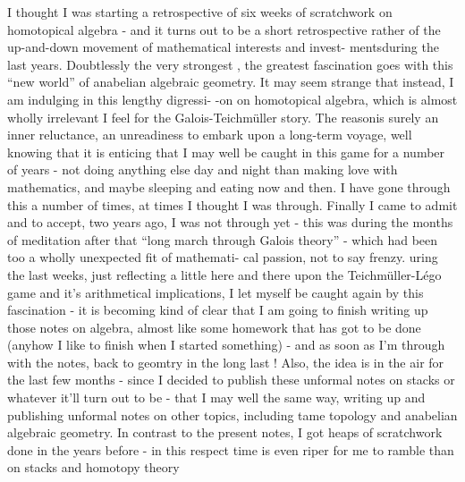 
I thought I was starting a retrospective of six weeks of scratchwork
on homotopical algebra  -  and it turns out to be a  short retrospective
rather of the up-and-down movement of  mathematical interests and invest-%
ments\hand{|}during the last years.  Doubtlessly the very strongest , the greatest
fascination goes with this ``new world'' of anabelian algebraic geometry.
It may seem strange that instead,  I am indulging in this lengthy digressi-%
-on on homotopical algebra,  which is almost wholly irrelevant I feel for
the Galois-Teichmüller story.  The reason\hand{|}is surely an inner reluctance,
an unreadiness to embark upon a long-term voyage,  well knowing that it is
 enticing that I may well be caught in this game for a number of
years - not doing anything else  day and night than making love with
mathematics,  and maybe sleeping and eating now and then.  I have gone
through this a number of times,  at times I thought I was through.  Finally
I came to admit and to accept,  two years ago,  I was not through yet -
this was during the months of meditation after that ``long march through
Galois theory'' -  which had been\hand{,} too\hand{,} a wholly unexpected fit of mathemati-%
cal passion, not to say frenzy.   uring the last weeks,  just
reflecting a little here and there upon the Teichmüller-Légo game and
it's arithmetical implications,  I let myself be caught again by this
fascination  - it is becoming kind of clear  that I am going to finish
writing up those notes on algebra,  almost like some homework that has got
to be done (anyhow I like to finish when I started  something)  -  and
as soon as I'm through with the notes,  back to geomtry in the long last !
Also,  the idea is in the air for the last few months  -  since I decided
to publish these unformal notes on stacks or whatever it'll turn out to be -
that I may well  the same way,  writing up and publishing unformal notes
on other topics,  including tame topology and anabelian algebraic geometry.
In contrast to the present notes,  I got heaps of scratchwork done  in the
years before  -  in this respect time is even riper for me to ramble  
 than on stacks and homotopy theory

